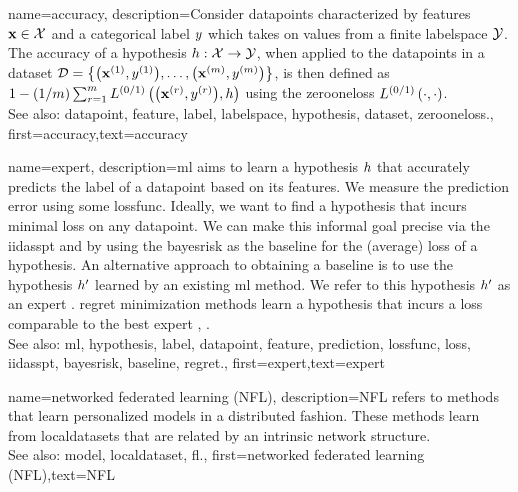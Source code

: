 {name={accuracy},
	description={Consider \glspl{datapoint} characterized by \glspl{feature} ${\bf x} \in \mathcal{X}$ and 
		a categorical \gls{label} $y$ which takes on values from a finite \gls{labelspace} $\mathcal{Y}$. The 
		accuracy of a \gls{hypothesis} $h: \mathcal{X} \rightarrow \mathcal{Y}$, when applied 
		to the \glspl{datapoint} in a \gls{dataset} $\mathcal{D} = \big\{ \big({\bf x}^{(1)}, y^{(1)} \big), \ldots, \big({\bf x}^{(m)},y^{(m)}\big) \big\}$, 
		is then defined as $1 - (1/m)\sum_{r=1}^{m} L^{(0/1)}\left(\big({\bf x}^{(r)},y^{(r)}\big),h \right)$ using the \gls{zerooneloss} $L^{(0/1)}\left(\cdot,\cdot \right)$.
					\\ 
		See also: \gls{datapoint}, \gls{feature}, \gls{label}, \gls{labelspace}, \gls{hypothesis}, \gls{dataset}, \gls{zerooneloss}.},
	first={accuracy},text={accuracy} 
}





{name={expert},
	description={\gls{ml} aims to learn a \gls{hypothesis} $h$ that accurately predicts the \gls{label} 
		of a \gls{datapoint} based on its \glspl{feature}. We measure the \gls{prediction} error using 
		some \gls{lossfunc}. Ideally, we want to find a \gls{hypothesis} that incurs minimal \gls{loss} 
		on any \gls{datapoint}. We can make this informal goal precise via the \gls{iidasspt} 
		and by using the \gls{bayesrisk} as the \gls{baseline} for the (average) \gls{loss} of a \gls{hypothesis}. 
		An alternative approach to obtaining a \gls{baseline} is to use the \gls{hypothesis} $h'$ learned 
		by an existing \gls{ml} method. We refer to this \gls{hypothesis} $h'$ as an expert \cite{PredictionLearningGames}. \Gls{regret} minimization methods learn a \gls{hypothesis}
		that incurs a \gls{loss} comparable to the best expert \cite{PredictionLearningGames}, \cite{HazanOCO}.
					\\ 
		See also: \gls{ml}, \gls{hypothesis}, \gls{label}, \gls{datapoint}, \gls{feature}, \gls{prediction}, \gls{lossfunc}, \gls{loss}, \gls{iidasspt}, \gls{bayesrisk}, \gls{baseline}, \gls{regret}.},
	first={expert},text={expert} 
}

{name={networked federated learning (NFL)},
	description={NFL refers 
		to methods that learn personalized \glspl{model} in a distributed fashion. These methods learn from \glspl{localdataset} 
		that are related by an intrinsic network structure.
					\\ 
		See also: \gls{model}, \gls{localdataset}, \gls{fl}.},
 first={networked federated learning (NFL)},text={NFL} 
}




